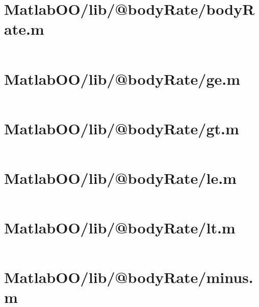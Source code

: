 \pagebreak
\section{MatlabOO/lib/@bodyRate/bodyRate.m}\label{code:MatlabOO/lib/@bodyRate/bodyRate.m}
\inputminted[linenos,fontsize=\scriptsize]{matlab}{/home/dcouture/git/mathyourlife/TSatPy/beta_versions/matlab_object_oriented/lib/@bodyRate/bodyRate.m}

\pagebreak
\section{MatlabOO/lib/@bodyRate/ge.m}\label{code:MatlabOO/lib/@bodyRate/ge.m}
\inputminted[linenos,fontsize=\scriptsize]{matlab}{/home/dcouture/git/mathyourlife/TSatPy/beta_versions/matlab_object_oriented/lib/@bodyRate/ge.m}

\pagebreak
\section{MatlabOO/lib/@bodyRate/gt.m}\label{code:MatlabOO/lib/@bodyRate/gt.m}
\inputminted[linenos,fontsize=\scriptsize]{matlab}{/home/dcouture/git/mathyourlife/TSatPy/beta_versions/matlab_object_oriented/lib/@bodyRate/gt.m}

\pagebreak
\section{MatlabOO/lib/@bodyRate/le.m}\label{code:MatlabOO/lib/@bodyRate/le.m}
\inputminted[linenos,fontsize=\scriptsize]{matlab}{/home/dcouture/git/mathyourlife/TSatPy/beta_versions/matlab_object_oriented/lib/@bodyRate/le.m}

\pagebreak
\section{MatlabOO/lib/@bodyRate/lt.m}\label{code:MatlabOO/lib/@bodyRate/lt.m}
\inputminted[linenos,fontsize=\scriptsize]{matlab}{/home/dcouture/git/mathyourlife/TSatPy/beta_versions/matlab_object_oriented/lib/@bodyRate/lt.m}

\pagebreak
\section{MatlabOO/lib/@bodyRate/minus.m}\label{code:MatlabOO/lib/@bodyRate/minus.m}
\inputminted[linenos,fontsize=\scriptsize]{matlab}{/home/dcouture/git/mathyourlife/TSatPy/beta_versions/matlab_object_oriented/lib/@bodyRate/minus.m}

